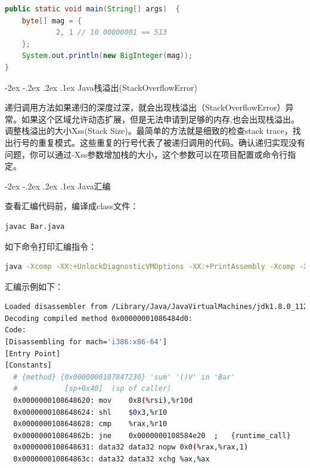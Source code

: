 \documentclass[8pt]{book}
\makeatletter
\numberwithin{dummy}{section}
\theoremstyle{ocrenumbox}
\theoremstyle{blacknumex}
\theoremstyle{blacknumbox}
\theoremstyle{ocrenum}
\renewcommand\paragraph{\@startsection{paragraph}{4}{\z@}
	{-2ex \@plus-.2ex \@minus .2ex}
	{.1ex}
	{\normalfont\small\sffamily\bfseries}}
\makeatother
\begin{document}
\begin{lstlisting}[language=Java]
public static void main(String[] args)  {
    byte[] mag = {
            2, 1 // 10 00000001 == 513
    };
    System.out.println(new BigInteger(mag));
}
\end{lstlisting}


\paragraph{Java栈溢出(StackOverflowError)}

递归调用方法如果递归的深度过深，就会出现栈溢出（StackOverflowError）异常。如果这个区域允许动态扩展，但是无法申请到足够的内存,也会出现栈溢出。调整栈溢出的大小Xss(Stack Size)。最简单的方法就是细致的检查stack trace，找出行号的重复模式。这些重复的行号代表了被递归调用的代码。确认递归实现没有问题，你可以通过-Xss参数增加栈的大小，这个参数可以在项目配置或命令行指定。

\paragraph{Java汇编}

查看汇编代码前，编译成class文件：

\begin{lstlisting}[language=Bash]
javac Bar.java
\end{lstlisting}


如下命令打印汇编指令：

\begin{lstlisting}[language=Bash]
java -Xcomp -XX:+UnlockDiagnosticVMOptions -XX:+PrintAssembly -Xcomp -XX:CompileCommand=dontinline,*Bar.sum -XX:CompileCommand=compileonly,*Bar.sum Bar
\end{lstlisting}

汇编示例如下：
 
\begin{lstlisting}[language=Bash]
Loaded disassembler from /Library/Java/JavaVirtualMachines/jdk1.8.0_112.jdk/Contents/Home/jre/lib/hsdis-amd64.dylib
Decoding compiled method 0x00000001086484d0:
Code:
[Disassembling for mach='i386:x86-64']
[Entry Point]
[Constants]
  # {method} {0x0000000107847230} 'sum' '()V' in 'Bar'
  #           [sp+0x40]  (sp of caller)
  0x0000000108648620: mov    0x8(%rsi),%r10d
  0x0000000108648624: shl    $0x3,%r10
  0x0000000108648628: cmp    %rax,%r10
  0x000000010864862b: jne    0x0000000108584e20  ;   {runtime_call}
  0x0000000108648631: data32 data32 nopw 0x0(%rax,%rax,1)
  0x000000010864863c: data32 data32 xchg %ax,%ax
\end{lstlisting}
\end{document}
